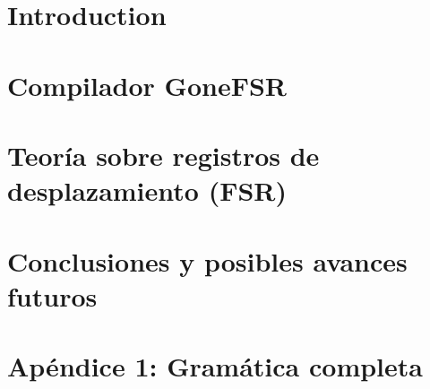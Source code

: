 \documentclass{tfg_domingo}
\begin{document}
\portada        
\frontmatter
\gracias{}
\resumen{}{}
\tableofcontents

\mainmatter
\chapter{Introduction}\label{cap:Intro}



\chapter{Compilador GoneFSR}\label{cap:Teoria}




\chapter{Teoría sobre registros de desplazamiento (FSR)}\label{cap:Resultados}




\chapter{Conclusiones y posibles avances futuros}\label{cap:Conclusiones}






\appendix
\chapter{Apéndice 1: Gramática completa }
\label{apéndice 1}

\end{document}

